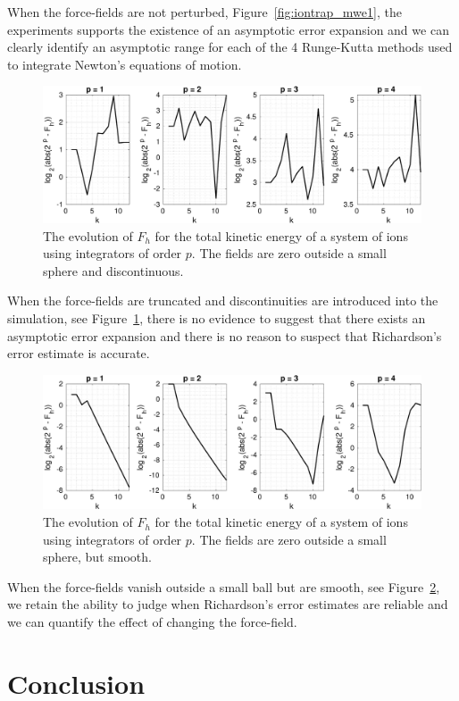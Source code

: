 \documentclass[runningheads]{llncs}
\begin{document}
When the force-fields are not perturbed, Figure~\ref{fig:iontrap_mwe1}, the experiments supports the existence of an asymptotic error expansion and we can clearly identify an asymptotic range for each of the 4 Runge-Kutta methods used to integrate Newton's equations of motion.
\begin{figure}[h!]
  \centering
  \includegraphics[width=\linewidth]{iontrap_mwe2.pdf}
  \caption{The evolution of $F_h$ for the total kinetic energy of a system of ions using integrators of order $p$. The fields are zero outside a small sphere and discontinuous.}
  \label{fig:iontrap_mwe2}
\end{figure}
When the force-fields are truncated and discontinuities are introduced into the simulation, see Figure~\ref{fig:iontrap_mwe2}, there is no evidence to suggest that there exists an asymptotic error expansion and there is no reason to suspect that Richardson's error estimate is accurate.
\begin{figure}
  \centering
  \includegraphics[width=\linewidth]{iontrap_mwe4.pdf}
  \caption{The evolution of $F_h$ for the total kinetic energy of a system of ions using integrators of order $p$. The fields are zero outside a small sphere, but smooth.}
  \label{fig:iontrap_mwe4}
\end{figure}
When the force-fields vanish outside a small ball but are smooth, see Figure~\ref{fig:iontrap_mwe4}, we retain the ability to judge when Richardson's error estimates are reliable and we can quantify the effect of changing the force-field.

\section{Conclusion}
\end{document}
